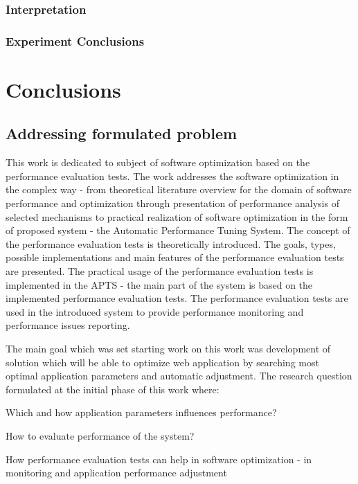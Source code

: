 \documentclass[12pt,a4paper]{article}
\let\tempone\itemize
\let\temptwo\enditemize
\renewenvironment{itemize}{\tempone\addtolength{\itemsep}{-0.4\baselineskip}}{\temptwo}
\begin{document}
\subsubsection{Interpretation}





\subsubsection{Experiment Conclusions}

\section{Conclusions} \label{section:conclusions}

\subsection{Addressing formulated problem}

This work is dedicated to subject of software optimization based on the performance evaluation tests. The work addresses the software optimization in the complex way - from theoretical literature overview for the domain of software performance and optimization through presentation of performance analysis of selected mechanisms to practical realization of software optimization in the form of proposed system - the Automatic Performance Tuning System. The concept of the performance evaluation tests is theoretically introduced. The goals, types, possible implementations and main features of the performance evaluation tests are presented. The practical usage of the performance evaluation tests is implemented in the APTS - the main part of the system is based on the implemented performance evaluation tests. The performance evaluation tests are used in the introduced system to provide performance monitoring and performance issues reporting.

The main goal which was set starting work on this work was development of solution which will be able to optimize web application by searching most optimal application parameters and automatic adjustment.  The research question formulated at the initial phase of this work where:
\begin{itemize}
\item Which and how application parameters influences performance?
\item How to evaluate performance of the system?
\item How performance evaluation tests can help in software optimization - in monitoring and application performance adjustment
\end{itemize} 
\end{document}
